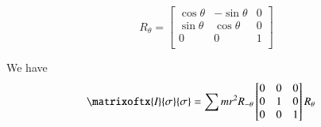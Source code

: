 \[
R_\theta =
\begin{bmatrix}
\cos\theta & -\sin\theta & 0 \\
\sin\theta & \cos\theta & 0 \\
0 & 0 & 1 \\
\end{bmatrix}
\]

We have
\begin{align*}
\matrixoftx{\emph{I}}{\sigma}{\sigma}
&=
\sum 
m r^2
R_{-\theta}
\begin{bmatrix}
0 & 0 & 0 \\
0 & 1 & 0 \\
0 & 0 & 1 \\
\end{bmatrix}
R_\theta
\end{align*}
